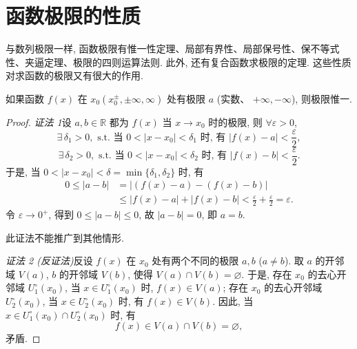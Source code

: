 \section{函数极限的性质}\label{sec:2.2}

与数列极限一样, 函数极限有惟一性定理、局部有界性、局部保号性、保不等式性、夹逼定理、极限的四则运算法则. 此外, 还有复合函数求极限的定理. 这些性质对求函数的极限又有很大的作用.

\begin{theorem}[极限的惟一性]\label{thm:2.2.1}
如果函数 $f(x)$ 在 $x_{0}(x_{0}^{\pm},\allowbreak \pm\infty, \infty)$ 处有极限 $a$ (实数、 $+\infty,\allowbreak -\infty$), 则极限惟一.
\end{theorem}

\begin{proof}
\textit{证法 1}\quad 设 $a, b \in \mathbb{R}$ 都为 $f(x)$ 当 $x \to x_0$ 时的极限, 则 $\forall \varepsilon > 0$,
\[
\exists\,\delta_{1}>0,\text{ s.t. 当 } 0<|x-x_{0}|<\delta_{1} \text{ 时, 有 } |f(x)-a|<\frac{\varepsilon}{2},
\]
\[
\exists\,\delta_{2}>0,\text{ s.t. 当 } 0<|x-x_{0}|<\delta_{2} \text{ 时, 有 } |f(x)-b|<\frac{\varepsilon}{2}.
\]
于是, 当 $0<|x-x_0|<\delta=\min\{\delta_1,\delta_2\}$ 时, 有
\begin{align*}
0\leqslant |a-b| &= |(f(x)-a)-(f(x)-b)| \\
&\leqslant |f(x)-a|+|f(x)-b| < \frac{\varepsilon}{2}+\frac{\varepsilon}{2}=\varepsilon.
\end{align*}
令 $\varepsilon \to 0^{+}$, 得到 $0 \leqslant |a - b| \leqslant 0$, 故 $|a - b| = 0$, 即 $a = b$.

此证法不能推广到其他情形.

\textit{证法 2 (反证法)}\quad 反设 $f(x)$ 在 $x_{0}$ 处有两个不同的极限 $a, b$ ($a \neq b$). 取 $a$ 的开邻域 $V(a)$, $b$ 的开邻域 $V(b)$, 使得 $V(a) \cap V(b) = \varnothing$. 于是, 存在 $x_{0}$ 的去心开邻域 $U_{1}^{\circ}(x_{0})$, 当 $x \in U_{1}^{\circ}(x_{0})$ 时, $f(x) \in V(a)$; 存在 $x_{0}$ 的去心开邻域 $U_{2}^{\circ}(x_{0})$, 当 $x \in U_{2}^{\circ}(x_{0})$ 时, 有 $f(x) \in V(b)$. 因此, 当 $x \in U_{1}^{\circ}(x_{0}) \cap U_{2}^{\circ}(x_{0})$ 时, 有
\[
f(x)\in V(a)\cap V(b)=\varnothing,
\]
矛盾.
\end{proof}

